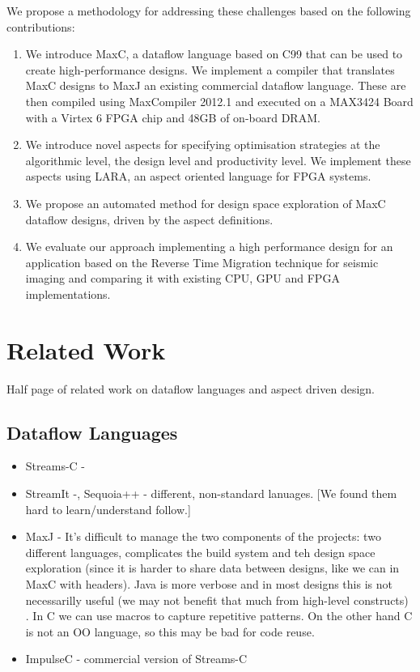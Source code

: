 We propose a methodology for addressing these challenges based on the
following contributions:
\begin{enumerate}
\item We introduce MaxC, a dataflow language based on C99 that can be
  used to create high-performance designs. We implement a compiler
  that translates MaxC designs to MaxJ an existing commercial dataflow
  language. These are then compiled using MaxCompiler 2012.1 and
  executed on a MAX3424 Board with a Virtex 6 FPGA chip and 48GB of
  on-board DRAM.
\item We introduce novel aspects for specifying optimisation
  strategies at the algorithmic level, the design level and
  productivity level. We implement these aspects using
  LARA, an aspect oriented language for FPGA systems.
\item We propose an automated method for design space exploration of
  MaxC dataflow designs, driven by the aspect definitions.
\item We evaluate our approach implementing a high performance design
  for an application based on the Reverse Time Migration technique for
  seismic imaging and comparing it with existing CPU, GPU and FPGA
  implementations.
\end{enumerate}

\section{Related Work}

\TODO Half page of related work on dataflow languages and aspect
driven design.

\subsection{Dataflow Languages}

\begin{itemize}

\item Streams-C -

\item StreamIt -, Sequoia++ - different, non-standard lanuages. [We
  found them hard to learn/understand follow.]

\item MaxJ - It’s difficult to manage the two components of the
  projects: two different languages, complicates the build system and
  teh design space exploration (since it is harder to share data
  between designs, like we can in MaxC with headers). Java is more
  verbose and in most designs this is not necessarilly useful (we may
  not benefit that much from high-level constructs) . In C we can use
  macros to capture repetitive patterns. On the other hand C is not an
  OO language, so this may be bad for code reuse.

\item ImpulseC - commercial version of Streams-C

\end{itemize}

